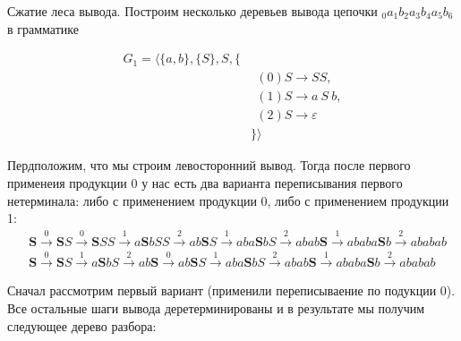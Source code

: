 \begin{example}
  Сжатие леса вывода.
  Построим несколько деревьев вывода цепочки $_0a_1b_2a_3b_4a_5b_6$ в грамматике

  \begin{align*}
   G_1 = \langle \{a,b\}, \{S\},  S, \{ & \\
       & \ \ (0) S \to S S, \\
       & \ \ (1) S \to a \ S \ b, \\
       & \ \ (2) S \to \varepsilon \\
  & \}  \rangle  
  \end{align*}

Пердположим, что мы строим левосторонний вывод.
Тогда после первого применеия продукции 0 у нас есть два варианта переписывания первого нетерминала: либо с применением продукции 0, либо с применением продукции 1:
\begin{align*}
&\textbf{S} \xrightarrow{0} \textbf{S}S \xrightarrow{0} \textbf{S}SS \xrightarrow{1} a\textbf{S}bSS \xrightarrow{2} ab\textbf{S}S \xrightarrow{1} aba\textbf{S}bS \xrightarrow{2} abab\textbf{S} \xrightarrow{1} ababa\textbf{S}b \xrightarrow{2} ababab
\\
&\textbf{S} \xrightarrow{0} \textbf{S}S \xrightarrow{1} a\textbf{S}bS \xrightarrow{2} ab\textbf{S} \xrightarrow{0} ab\textbf{S}S \xrightarrow{1} aba\textbf{S}bS \xrightarrow{2} abab\textbf{S} \xrightarrow{1} ababa\textbf{S}b \xrightarrow{2} ababab
\end{align*}

Сначал рассмотрим первый вариант (применили переписываение по подукции 0).
Все остальные шаги вывода деретерминированы и в результате мы получим следующее дерево разбора:

\begin{center}
\end{center}
\end{example}

